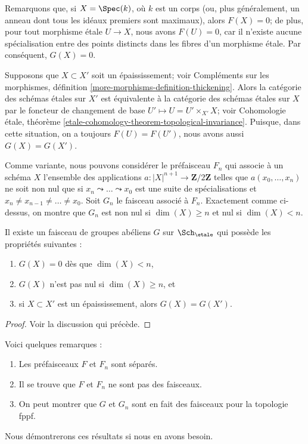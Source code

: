 \medskip\noindent
Remarquons que, si $X = \Spec(k)$, où $k$ est un corps (ou, plus généralement,
un anneau dont tous les idéaux premiers sont maximaux), alors $F(X) = 0$;
de plus, pour tout morphisme \'etale $U \to X$, nous avons $F(U) = 0$, car il
n'existe aucune spécialisation entre des points distincts dans les fibres d'un
morphisme \'etale. Par conséquent, $G(X) = 0$.

\medskip\noindent
Supposons que $X \subset X'$ soit un épaississement; voir
Compléments sur les morphismes, définition \ref{more-morphisms-definition-thickening}.
Alors la catégorie des schémas \'etales sur $X'$ est équivalente à la
catégorie des schémas \'etales sur $X$ par le foncteur de changement de base
$U' \mapsto U = U' \times_{X'} X$; voir
Cohomologie \'etale,
théorème \ref{etale-cohomology-theorem-topological-invariance}.
Puisque, dans cette situation, on a toujours $F(U) = F(U')$,
nous avons aussi $G(X) = G(X')$.

\medskip\noindent
Comme variante, nous pouvons considérer le préfaisceau $F_n$ qui associe
à un schéma $X$ l'ensemble des applications
$a : |X|^{n + 1} \to \mathbf{Z}/2\mathbf{Z}$ telles que $a(x_0, \ldots, x_n)$
ne soit non nul que si $x_n \leadsto \ldots \leadsto x_0$ est une suite de
spécialisations et $x_n \not = x_{n - 1} \not = \ldots \not = x_0$.
Soit $G_n$ le faisceau associé à $F_n$.
Exactement comme ci-dessus, on montre que $G_n$ est non nul
si $\dim(X) \geq n$ et nul si $\dim(X) < n$.

\begin{lemma}
\label{lemma-sheaf-zero-on-low-dimension}
Il existe un faisceau de groupes abéliens $G$ sur
$\Sch_\etale$ qui possède les propriétés suivantes :
\begin{enumerate}
\item $G(X) = 0$ dès que $\dim(X) < n$,
\item $G(X)$ n'est pas nul si $\dim(X) \geq n$, et
\item si $X \subset X'$ est un épaississement, alors $G(X) = G(X')$.
\end{enumerate}
\end{lemma}

\begin{proof}
Voir la discussion qui précède.
\end{proof}

\begin{remark}
\label{remark-specialization}
Voici quelques remarques :
\begin{enumerate}
\item Les préfaisceaux $F$ et $F_n$ sont séparés.
\item Il se trouve que $F$ et $F_n$ ne sont pas des faisceaux.
\item On peut montrer que $G$ et $G_n$ sont en fait des faisceaux pour la topologie fppf.
\end{enumerate}
Nous démontrerons ces résultats si nous en avons besoin.
\end{remark}


